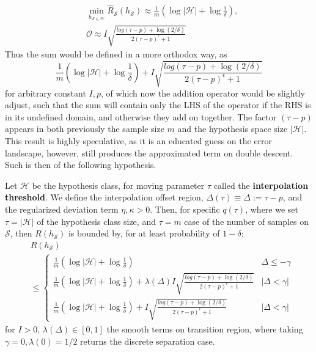 \begin{align}
    &\min_{h_{\mathcal{S}\in\mathcal{H}}}\hat{R}_{\mathcal{S}}(h_{\mathcal{S}}) \approx \frac{1}{m} \left( \log{|\mathcal{H}|} + \log{\frac{1}{\delta}} \right),\\
    & \mathcal{O} \approx I \sqrt{\frac{log{(\tau - p)+\log{(2/\delta)}}}{2(\tau-p)^{\epsilon}+1}}
\end{align}
Thus the sum would be defined in a more orthodox way, as 
\begin{equation}
   \frac{1}{m} \left( \log{|\mathcal{H}|} + \log{\frac{1}{\delta}} \right) + I \sqrt{\frac{log{(\tau - p)+\log{(2/\delta)}}}{2(\tau-p)^{\epsilon}+1}}
\end{equation}
for arbitrary constant $I,p$, of which now the addition operator would be slightly adjust, such that the sum will contain only the LHS of the operator if the RHS is in its undefined domain, and otherwise they add on together. The factor $(\tau-p)$ appears in both previously the sample size $m$ and the hypothesis space size $|\mathcal{H}|$. This result is highly speculative, as it is an educated guess on the error landscape, however, still produces the approximated term on double descent. Such is then of the following hypothesis. 

\begin{hypothesis}\label{hyp:interpolation_tau}
    Let $\mathcal{H}$ be the hypothesis class, for moving parameter $\tau$ called the \textbf{interpolation threshold}. We define the interpolation offset region, $\Delta(\tau)\equiv\Delta := \tau-p$, and the regularized deviation term $\eta,\kappa>0$. Then, for specific $q(\tau)$, where we set $\tau=|\mathcal{H}|$ of the hypothesis class size, and $\tau=m$ case of the number of samples on $\mathcal{S}$, then $R(h_{\mathcal{S}})$ is bounded by, for at least probability of $1-\delta$: 
    \begin{equation}
        \begin{split}
            & R(h_{\mathcal{S}})\\
            &\leq \begin{cases}
            \frac{1}{m} \left( \log{|\mathcal{H}|} + \log{\frac{1}{\delta}} \right) & \Delta \leq -\gamma \\
            \frac{1}{m} \left( \log{|\mathcal{H}|} + \log{\frac{1}{\delta}} \right) + \lambda(\Delta) I \sqrt{\frac{log{(\tau - p)+\log{(2/\delta)}}}{2(\tau-p)^{\epsilon}+1}} & |\Delta <\gamma| \\
            \frac{1}{m} \left( \log{|\mathcal{H}|} + \log{\frac{1}{\delta}} \right) + I\sqrt{\frac{log{(\tau - p)+\log{(2/\delta)}}}{2(\tau-p)^{\epsilon}+1}} & |\Delta <\gamma| 
        \end{cases}
        \end{split}
    \end{equation}
    for $I>0$, $\lambda(\Delta)\in[0,1]$ the smooth terms on transition region, where taking $\gamma =0, \lambda(0)=1/2$ returns the discrete separation case. 
\end{hypothesis}

